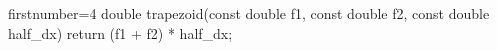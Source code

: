\begin{cppcode*}{firstnumber=4}
double trapezoid(const double f1, const double f2, const double half_dx) {
  return (f1 + f2) * half_dx;
}
\end{cppcode*}

